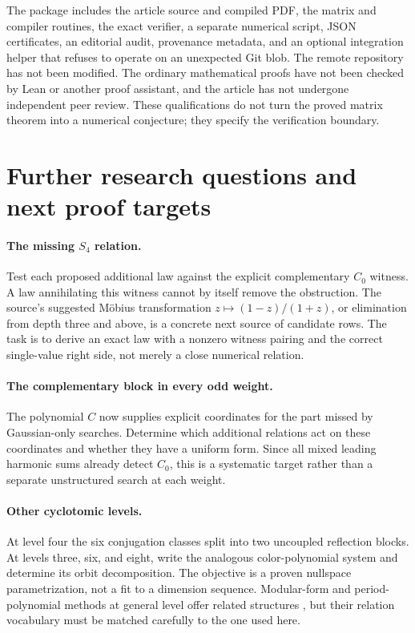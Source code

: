 \documentclass[11pt,a4paper]{article}
\numberwithin{equation}{section}
\theoremstyle{definition}\newtheorem{definition}[theorem]{Definition}
\theoremstyle{remark}\newtheorem{remark}[theorem]{Remark}
\begin{document}
The package includes the article source and compiled PDF, the matrix and
compiler routines, the exact verifier, a separate numerical script,
JSON certificates, an editorial audit, provenance metadata, and an optional
integration helper that refuses to operate on an unexpected Git blob.
The remote repository has not been modified. The ordinary mathematical
proofs have not been checked by Lean or another proof assistant, and the
article has not undergone independent peer review. These qualifications do
not turn the proved matrix theorem into a numerical conjecture; they specify
the verification boundary.

\section{Further research questions and next proof targets}
\label{sec:future}
\paragraph{The missing $S_4$ relation.}
Test each proposed additional law against the explicit complementary
$C_0$ witness. A law annihilating this witness cannot by itself remove the
obstruction. The source's suggested M\"obius transformation
$z\mapsto(1-z)/(1+z)$, or elimination from depth three and above, is a
concrete next source of candidate rows. The task is to derive an exact law
with a nonzero witness pairing and the correct single-value right side,
not merely a close numerical relation.

\paragraph{The complementary block in every odd weight.}
The polynomial $C$ now supplies explicit coordinates for the part missed by
Gaussian-only searches. Determine which additional relations act on these
coordinates and whether they have a uniform form. Since all mixed leading
harmonic sums already detect $C_0$, this is a systematic target rather than
a separate unstructured search at each weight.

\paragraph{Other cyclotomic levels.}
At level four the six conjugation classes split into two uncoupled reflection
blocks. At levels three, six, and eight, write the analogous color-polynomial
system and determine its orbit decomposition. The objective is a proven
nullspace parametrization, not a fit to a dimension sequence. Modular-form
and period-polynomial methods at general level offer related structures
\cite{hirose}, but their relation vocabulary must be matched carefully to the
one used here.
\end{document}
